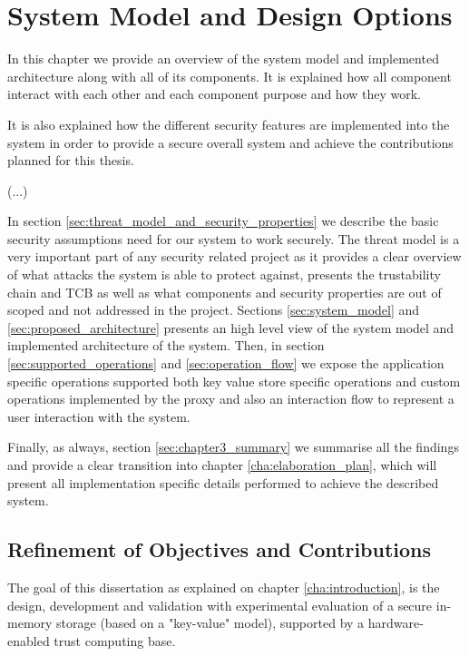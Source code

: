 
\chapter{System Model and Design Options}
\label{cha:system_model_and_design_options}

In this chapter we provide an overview of the system model and implemented architecture along with all of its components. It is explained how all component interact with each other and each component purpose and how they work.

It is also explained how the different security features are implemented into the system in order to provide a secure overall system and achieve the contributions planned for this thesis.

(...)

In section \ref{sec:threat_model_and_security_properties} we describe the basic security assumptions need for our system to work securely. The threat model is a very important part of any security related project as it provides a clear overview of what attacks the system is able to protect against, presents the trustability chain and \gls{TCB} as well as what components and  security properties are out of scoped and not addressed in the project.
Sections \ref{sec:system_model} and \ref{sec:proposed_architecture} presents an high level view of the system model and implemented architecture of the system. Then, in section \ref{sec:supported_operations} and \ref{sec:operation_flow} we expose the application specific operations supported both key value store specific operations and custom operations implemented by the proxy and also an interaction flow to represent a user interaction with the system.

Finally, as always, section \ref{sec:chapter3_summary} we summarise all the findings and provide a clear transition into chapter \ref{cha:elaboration_plan}, which will present all implementation specific details performed to achieve the described system.

\section{Refinement of Objectives and Contributions} %
\label{sec:refinement_of_objectives_and_contributions}

The goal of this dissertation as explained on chapter \ref{cha:introduction}, is the design, development and validation with experimental evaluation of a secure in-memory storage (based on a "key-value" model), supported by a hardware-enabled trust computing base.

